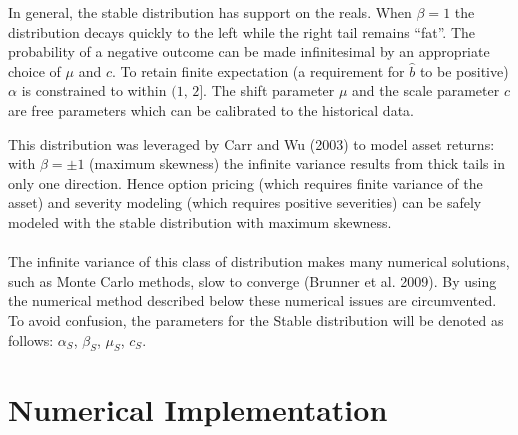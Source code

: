 \documentclass{article}
\theoremstyle{definition}
\begin{document}
In general, the stable distribution has support on the reals.  When \(\beta=1\) the distribution decays quickly to the left while the right tail remains ``fat''.  The probability of a negative outcome can be made infinitesimal by an appropriate choice of \(\mu\) and \(c\).  To retain finite expectation (a requirement for \(\hat{b}\) to be positive) \(\alpha\) is constrained to within \((1,\, 2]\).  The shift parameter \(\mu\) and the scale parameter \(c\) are free parameters which can be calibrated to the historical data.  


This distribution was leveraged by Carr and Wu (2003) to model asset returns: with \(\beta=\pm 1\) (maximum skewness) the infinite variance results from thick tails in only one direction. Hence option pricing (which requires finite variance of the asset) and severity modeling (which requires positive severities) can be safely modeled with the stable distribution with maximum skewness.   
\\
\\
The infinite variance of this class of distribution makes many numerical solutions, such as Monte Carlo methods, slow to converge (Brunner et al. 2009).  By using the numerical method described below these numerical issues are circumvented. To avoid confusion, the parameters for the Stable distribution will be denoted as follows: \(\alpha_S\), \(\beta_S\),  \(\mu_{S}\), \(c_{S}\).

\section{Numerical Implementation}
\end{document}
